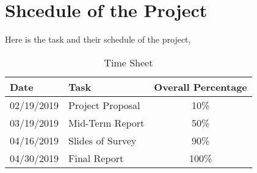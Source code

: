\documentclass[11pt, conference, onecolumn]{IEEEtran}
\begin{document}
\section{Shcedule of the Project}
Here is the task and their schedule of the project,
\begin{table}[htb]
  \small
\caption{Time Sheet}
\label{tab:timesheet}
\centering
\begin{tabular}[c]{| l | l | c|}
\hline
Date & Task & Overall Percentage \\ \hline
02/19/2019 & Project Proposal & 10\% \\ \hline
03/19/2019 & Mid-Term Report & 50\% \\ \hline
04/16/2019 & Slides of Survey & 90\% \\ \hline
04/30/2019 & Final Report & 100\% \\ \hline
\end{tabular}
\end{table}



\end{document}
